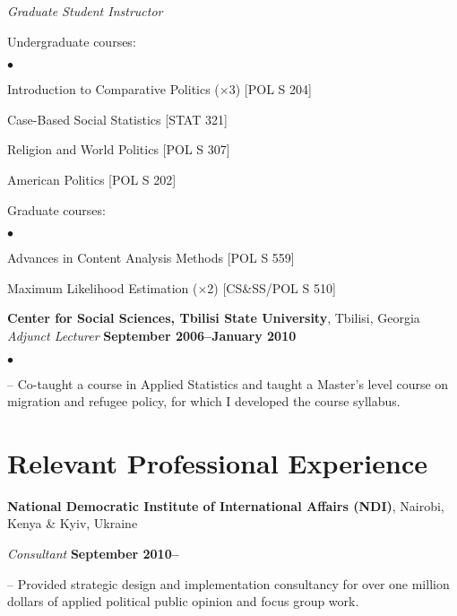 \documentclass[margin,line]{res}
\newenvironment{list1}{
  \begin{list}{\ding{113}}{%
      \setlength{\itemsep}{0in}
      \setlength{\parsep}{0in} \setlength{\parskip}{0in}
      \setlength{\topsep}{0in} \setlength{\partopsep}{0in} 
      \setlength{\leftmargin}{0.17in}}}{\end{list}}
\newenvironment{list2}{
  \begin{list}{$\bullet$}{%
      \setlength{\itemsep}{0in}
      \setlength{\parsep}{0in} \setlength{\parskip}{0in}
      \setlength{\topsep}{0in} \setlength{\partopsep}{0in} 
      \setlength{\leftmargin}{0.2in}}}{\end{list}}
\begin{document}
{\begin{resume}
{\em Graduate Student Instructor} \\
\vspace{-.1in}
\begin{list1}
 \item[] Undergraduate courses:
   \begin{list2}
   \item[] Introduction to Comparative Politics ($\times$3)
   [POL S 204]
   \item[] Case-Based Social Statistics [STAT 321]
   \item[]Religion and World Politics [POL S 307]
     \item[] American Politics [POL S 202] 
\end{list2}
\item[] Graduate courses:
   \begin{list2}
     \item [] Advances in Content Analysis Methods [POL S 559]
     \item [] Maximum Likelihood Estimation ($\times$2) [CS\&SS/POL S 510]
\end{list2}
\end{list1}

{\bf Center for Social Sciences, Tbilisi State University}, Tbilisi,
Georgia \\
\vspace{-.1cm}
{\em Adjunct Lecturer} \hfill {\bf September 2006--January 2010}\\
\begin{list2}
\item[]-- Co-taught a course in Applied Statistics and taught a Master’s level course on migration and refugee policy, for which I developed the course syllabus.
\end{list2}
\clearpage
\section{\sc Relevant Professional Experience}
{\bf National Democratic Institute of International Affairs (NDI)},
Nairobi, Kenya \& Kyiv, Ukraine

\vspace{-.3cm}
{\em Consultant} \hfill {\bf
  September 2010--}\\
\begin{list1}
\item[]-- Provided strategic design and implementation consultancy
  for over one million dollars of applied
political public opinion and focus group work.
\end{list1}


\end{resume}}
\end{document}
